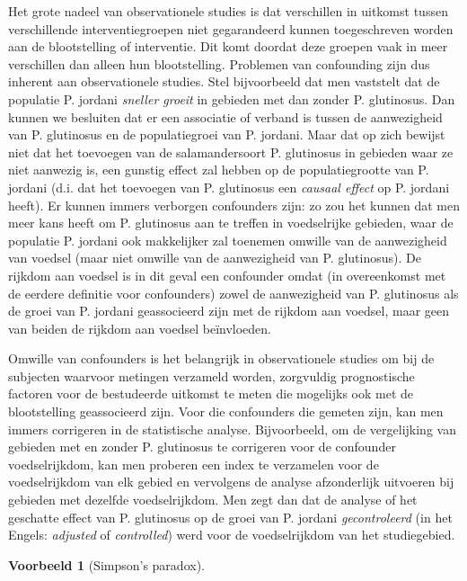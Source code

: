 \documentclass[
  dutch,
  letterpaper,
  12pt]{book}
\theoremstyle{definition}
\theoremstyle{definition}
\theoremstyle{definition}
\newtheorem{example}{Voorbeeld}[chapter]
\theoremstyle{remark}
\begin{document}
Het grote nadeel van observationele studies is dat verschillen in
uitkomst tussen verschillende interventiegroepen niet gegarandeerd
kunnen toegeschreven worden aan de blootstelling of interventie. Dit
komt doordat deze groepen vaak in meer verschillen dan alleen hun
blootstelling. Problemen van confounding zijn dus inherent aan
observationele studies. Stel bijvoorbeeld dat men vaststelt dat de
populatie P. jordani \emph{sneller groeit} in gebieden met dan zonder P.
glutinosus. Dan kunnen we besluiten dat er een associatie of verband is
tussen de aanwezigheid van P. glutinosus en de populatiegroei van P.
jordani. Maar dat op zich bewijst niet dat het toevoegen van de
salamandersoort P. glutinosus in gebieden waar ze niet aanwezig is, een
gunstig effect zal hebben op de populatiegrootte van P. jordani (d.i.
dat het toevoegen van P. glutinosus een \emph{causaal effect} op P.
jordani heeft). Er kunnen immers verborgen confounders zijn: zo zou het
kunnen dat men meer kans heeft om P. glutinosus aan te treffen in
voedselrijke gebieden, waar de populatie P. jordani ook makkelijker zal
toenemen omwille van de aanwezigheid van voedsel (maar niet omwille van
de aanwezigheid van P. glutinosus). De rijkdom aan voedsel is in dit
geval een confounder omdat (in overeenkomst met de eerdere definitie
voor confounders) zowel de aanwezigheid van P. glutinosus als de groei
van P. jordani geassocieerd zijn met de rijkdom aan voedsel, maar geen
van beiden de rijkdom aan voedsel beïnvloeden.

Omwille van confounders is het belangrijk in observationele studies om
bij de subjecten waarvoor metingen verzameld worden, zorgvuldig
prognostische factoren voor de bestudeerde uitkomst te meten die
mogelijks ook met de blootstelling geassocieerd zijn. Voor die
confounders die gemeten zijn, kan men immers corrigeren in de
statistische analyse. Bijvoorbeeld, om de vergelijking van gebieden met
en zonder P. glutinosus te corrigeren voor de confounder voedselrijkdom,
kan men proberen een index te verzamelen voor de voedselrijkdom van elk
gebied en vervolgens de analyse afzonderlijk uitvoeren bij gebieden met
dezelfde voedselrijkdom. Men zegt dan dat de analyse of het geschatte
effect van P. glutinosus op de groei van P. jordani \emph{gecontroleerd}
(in het Engels: \emph{adjusted} of \emph{controlled}) werd voor de
voedselrijkdom van het studiegebied.

\begin{example}[Simpson's
paradox]\protect\hypertarget{exm-simpson-s-paradox}{}\label{exm-simpson-s-paradox}

~

\end{example}
\end{document}
